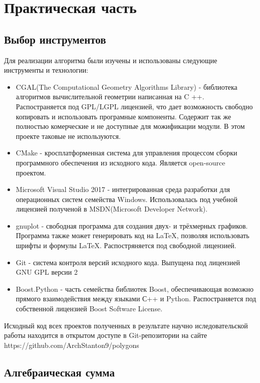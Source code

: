\chapter{Практическая часть}

\section{Выбор инструментов}

Для реализации алгоритма были изучены и использованы
следующие инструменты и технологии:

\begin{itemize}
    \item CGAL(The Computational Geometry Algorithms Library) -
    библиотека алгоритмов вычислительной геометрии
    написанная на C ++. Распостраняется под GPL/LGPL лицензией,
    что дает возможность свободно копировать и использовать 
    програмные компоненты.
    Содержит так же полностью комерческие и не доступные для можификации модули.
    В этом проекте таковые не используются.
    \item CMake - кросплатформенная система
    для управления процессом сборки программного обеспечения
    из исходного кода. Является open-source проектом.
    \item Microsoft Visual Studio 2017 - интегрированная среда разработки
    для операционных систем семейства Windows.
    Использовалась под учебной лицензией полученой в
    MSDN(Microsoft Developer Network).
    \item gnuplot - свободная программа для создания двух- и трёхмерных графиков.
    Программа также может генерировать код на LaTeX,
    позволяя использовать шрифты и формулы LaTeX.
    Распостряняется под свободной лицензией.
    \item Git - система контроля версий исходного кода.
    Выпущена под лицензией GNU GPL версии 2
    \item Boost.Python - часть семейства библиотек Boost,
    обеспечивающая возможно прямого взаимодействия между языками С++ и Python. 
    Распостраняется под собственной лицензией Boost Software License.

\end{itemize}

Исходный код всех проектов полученных
в результате научно иследовательской работы находится
в открытом доступе в Git-репозитории на сайте https://github.com/ArchStanton9/polygons


\section{Алгебраическая сумма}

